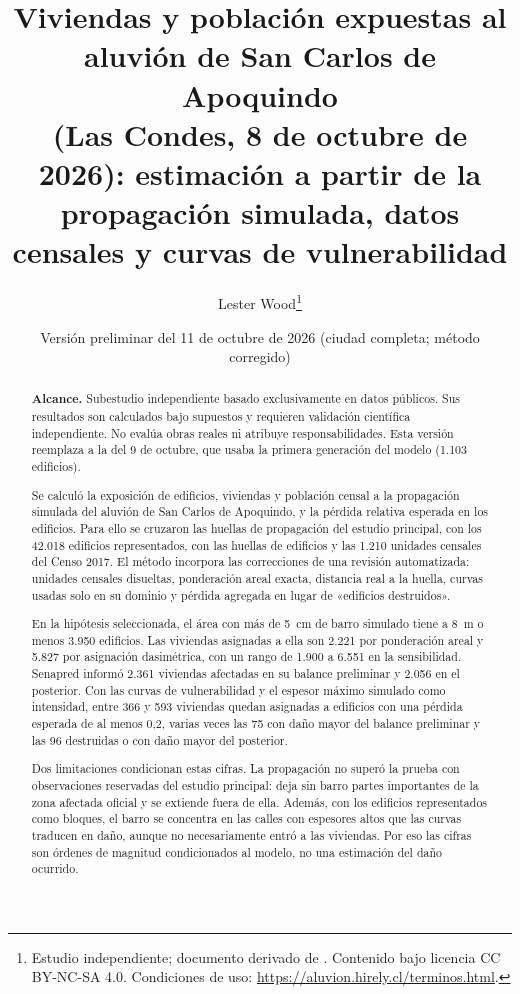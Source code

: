 \documentclass[10pt,a4paper]{article}
\title{Viviendas y población expuestas al aluvión de San Carlos de Apoquindo\\(Las Condes, 8 de octubre de 2026): estimación a partir de la\\propagación simulada, datos censales y curvas de vulnerabilidad}
\author{Lester Wood\thanks{Estudio independiente; documento derivado de \citet{wood2026}. Contenido bajo licencia CC BY-NC-SA 4.0. Condiciones de uso: \url{https://aluvion.hirely.cl/terminos.html}.}}
\date{Versión preliminar del 11 de octubre de 2026 (ciudad completa; método corregido)}
\begin{document}
\maketitle

\begin{abstract}
\noindent\textbf{Alcance.} Subestudio independiente basado exclusivamente en datos públicos. Sus resultados son calculados bajo supuestos y requieren validación científica independiente. No evalúa obras reales ni atribuye responsabilidades. Esta versión reemplaza a la del 9 de octubre, que usaba la primera generación del modelo (1.103 edificios).\par\medskip
\noindent Se calculó la exposición de edificios, viviendas y población censal a la propagación simulada del aluvión de San Carlos de Apoquindo, y la pérdida relativa esperada en los edificios. Para ello se cruzaron las huellas de propagación del estudio principal, con los 42.018 edificios representados, con las huellas de edificios y las 1.210 unidades censales del Censo 2017. El método incorpora las correcciones de una revisión automatizada: unidades censales disueltas, ponderación areal exacta, distancia real a la huella, curvas usadas solo en su dominio y pérdida agregada en lugar de «edificios destruidos».

En la hipótesis seleccionada, el área con más de \SI{5}{cm} de barro simulado tiene a 8~m o menos 3.950 edificios. Las viviendas asignadas a ella son 2.221 por ponderación areal y 5.827 por asignación dasimétrica, con un rango de 1.900 a 6.551 en la sensibilidad. Senapred informó 2.361 viviendas afectadas en su balance preliminar y 2.056 en el posterior. Con las curvas de vulnerabilidad y el espesor máximo simulado como intensidad, entre 366 y 593 viviendas quedan asignadas a edificios con una pérdida esperada de al menos 0,2, varias veces las 75 con daño mayor del balance preliminar y las 96 destruidas o con daño mayor del posterior.

Dos limitaciones condicionan estas cifras. La propagación no superó la prueba con observaciones reservadas del estudio principal: deja sin barro partes importantes de la zona afectada oficial y se extiende fuera de ella. Además, con los edificios representados como bloques, el barro se concentra en las calles con espesores altos que las curvas traducen en daño, aunque no necesariamente entró a las viviendas. Por eso las cifras son órdenes de magnitud condicionados al modelo, no una estimación del daño ocurrido.
\end{abstract}
\end{document}
